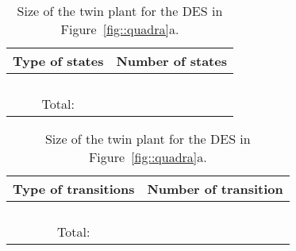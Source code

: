 \documentclass{article}
\begin{document}
\begin{table}[t!]
  \begin{minipage}{.5\linewidth}
    \begin{center}
      \begin{tabular}{c | c}
        Type of states & Number of states\\ 
        \hline 
         & \\
         & \\
         & \\
         & \\
        \hline
        Total: & 
      \end{tabular}
    \end{center}
  \end{minipage}\begin{minipage}{.5\linewidth}
    \begin{center}
      \begin{tabular}{c | c}
        Type of transitions & Number of transition\\ 
        \hline 
         & \\
         & \\
         & \\
         
        & \\
        \hline
        Total: & 
      \end{tabular}
    \end{center}
  \end{minipage}
  \caption{Size of the twin plant for the DES in Figure~\ref{fig::quadra}a.}
  \label{tab::tpsize}
\end{table}
\end{document}
